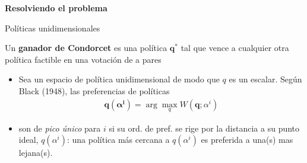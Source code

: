 \documentclass[
  ignorenonframetext,
]{beamer}
\providecommand{\tightlist}{%
  \setlength{\itemsep}{0pt}\setlength{\parskip}{0pt}}\usepackage{longtable,booktabs,array}
\begin{document}
\begin{frame}{\textbf{Resolviendo el problema}}
\begin{block}{Políticas unidimensionales}
\begin{tcolorbox}
Un \textbf{ganador de Condorcet} es una política \(\mathbf{q^{*}}\) tal
que vence a cualquier otra política factible en una votación de a pares

\end{tcolorbox}

\begin{itemize}
\tightlist
\item
  Sea un espacio de política unidimensional de modo que \(q\) es un
  escalar. Según Black (1948), las preferencias de políticas
  \[\begin{aligned}
  \mathbf{q(\alpha^{i})}=\arg\max_{q} W(\mathbf{q};\alpha^{i})
  \end{aligned}\]
\item
  son de \emph{pico único} para \(i\) si su ord. de pref. se rige por la
  distancia a su punto ideal, \(q(\alpha^{i})\): una política más
  cercana a \(q(\alpha^{i})\) es preferida a una(s) mas lejana(s).
\end{itemize}
\end{block}
\end{frame}
\end{document}
